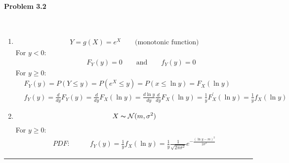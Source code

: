 \documentclass[12pt, letterpaper]{scrartcl}
\begin{document}
\paragraph*{Problem 3.2} \hfill\\
\begin{enumerate}[((a))]
    \item 
    \begin{align*}
        Y=g(X)=e^X \qquad \textrm{(monotonic function)}
    \end{align*}
    {\color{blue} For $y<0$}:
    \begin{align*}
        \qquad F_Y(y)=0 \qquad \text{and} \qquad f_Y(y)=0
    \end{align*}
    {\color{blue} For $y\geq 0$}:
    \begin{align*}
        &F_Y(y)=P(Y\leq y)=P(e^X\leq y)=P(x\leq\ln{y})=F_X(\ln{y})\\
        &f_Y(y)=\frac{d}{dy}F_Y(y)=\frac{d}{dy}F_X(\ln{y})=\frac{d\ln{y}}{dy}\frac{d}{dy}F_X(\ln{y})=\frac{1}{y}F_X^\prime(\ln{y})=\frac{1}{y}f_X(\ln{y})
    \end{align*}
    
    \item 
    \begin{align*}
        X\thicksim\mathcal{N}(m, \sigma^2)
    \end{align*}
    {\color{blue} For $y\geq0$}:
    \begin{align*}
        PDF:&\qquad f_Y(y)=\frac{1}{y}f_X(\ln{y})=\frac{1}{y}\frac{1}{\sqrt{2\pi\sigma^2}}e^{-\frac{(\ln y-m)^2}{2\sigma^2}}
    \end{align*}
\end{enumerate}
\hrule
\end{document}
